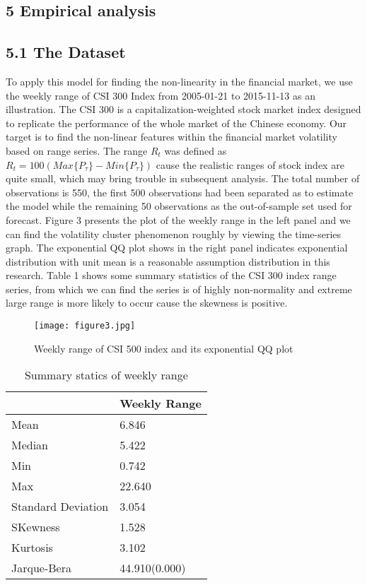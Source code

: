 \documentclass[
journal=jacsat, %
manuscript=article]{achemso}
\begin{document}
\begin{CJK*}{UTF8}{song}
\section{5 Empirical analysis}
\subsection{5.1  The Dataset}
To apply this model for finding the non-linearity in the financial market, we use the weekly range of CSI 300 Index from 2005-01-21 to 2015-11-13 as an illustration. The CSI 300 is a capitalization-weighted stock market index designed to replicate the performance of the whole market of the Chinese economy. Our target is to find the non-linear features within the financial market volatility based on range series. The range $R_t$ was defined as $R_t = 100(Max\{P_{\tau}\} - Min\{P_{\tau}\})$ cause the realistic ranges of stock index are quite small, which may bring trouble in subsequent analysis. The total number of observations is 550, the first 500 observations had been separated as to estimate the model while the remaining 50 observations as the out-of-sample set used for forecast. Figure 3 presents the plot of the weekly range in the left panel and we can find the volatility cluster phenomenon roughly by viewing the time-series graph. The exponential QQ plot shows in the right panel indicates exponential distribution with unit mean is a reasonable assumption distribution in this research. Table 1 shows some summary statistics of the CSI 300 index range series, from which we can find the series is of highly non-normality and extreme large range is more likely to occur cause the skewness is positive.

\begin{figure}[H]
\centering
\texttt{[image: figure3.jpg]}\\
\captionsetup{justification=raggedright, singlelinecheck=off}
\caption{Weekly range of CSI 500 index and its exponential QQ plot}
\end{figure}

\begin{table}[H]
\begin{center}
\captionsetup{format=plain, labelfont=bf, singlelinecheck=off, labelsep=newline}
\caption{Summary statics of weekly range}
\begin{tabular}{L{0.4\textwidth}C{0.5\textwidth}}
\hline
& Weekly Range\\
\hline
Mean & 6.846\\
Median & 5.422\\
Min & 0.742\\
Max & 22.640\\
Standard Deviation & 3.054\\
SKewness & 1.528\\
Kurtosis & 3.102\\
Jarque-Bera & 44.910(0.000)\\
\hline
\end{tabular}
\end{center}
\end{table}


\end{CJK*}
\end{document}

